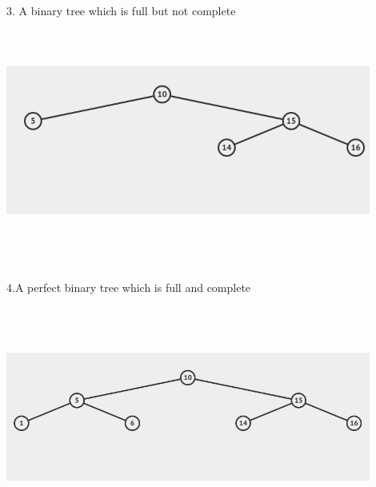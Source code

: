 \documentclass{report}
\begin{document}
    3. A binary tree which is full but not complete\\
        \includegraphics[height = 80mm,width = 120mm]{1_3.png}\\\\
    4.A perfect binary tree which is full and complete\\
    \includegraphics[height = 80mm,width = 120mm]{1_4.png}\\
\end{document}
